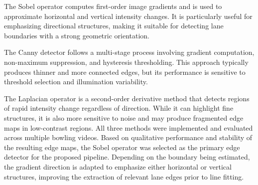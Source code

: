 The Sobel operator computes first-order image gradients and is used to approximate horizontal and vertical intensity changes. It is particularly useful for emphasizing directional structures, making it suitable for detecting lane boundaries with a strong geometric orientation.

The Canny detector follows a multi-stage process involving gradient computation, non-maximum suppression, and hysteresis thresholding. This approach typically produces thinner and more connected edges, but its performance is sensitive to threshold selection and illumination variability.

The Laplacian operator is a second-order derivative method that detects regions of rapid intensity change regardless of direction. While it can highlight fine structures, it is also more sensitive to noise and may produce fragmented edge maps in low-contrast regions.
All three methods were implemented and evaluated across multiple bowling videos. Based on qualitative performance and stability of the resulting edge maps, the Sobel operator was selected as the primary edge detector for the proposed pipeline. Depending on the boundary being estimated, the gradient direction is adapted to emphasize either horizontal or vertical structures, improving the extraction of relevant lane edges prior to line fitting.

